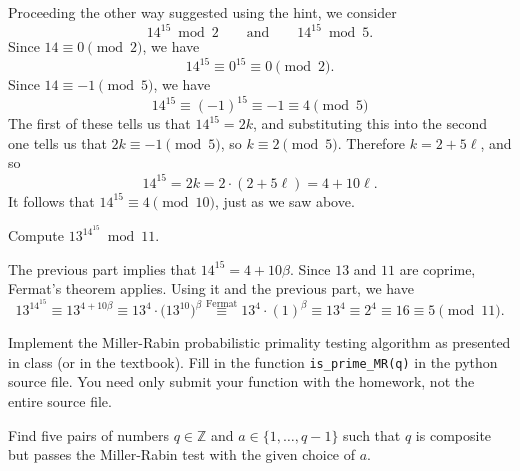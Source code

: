 \documentclass[oneside]{amsart}  %
\newcommand{\ZZ}{\mathbb{Z}}
\theoremstyle{plain}
\theoremstyle{definition}
\theoremstyle{remark}
\newcommand{\ds}[1]{ \displaystyle{#1} }
\numberwithin{equation}{section}  %
\begin{document}
\begin{questions}
\begin{questions}
\begin{solution}
Proceeding the other way suggested using the hint, we consider
\[
  14^{15} \bmod{2}
  \qquad\text{and}\qquad
  14^{15} \bmod{5}.
\]
Since $14 \equiv 0 \pmod{2}$, we have
\[
  14^{15}
  \equiv 0^{15}
  \equiv 0 \pmod{2}.
\]
Since $14 \equiv -1 \pmod{5}$, we have
\[
  14^{15}
  \equiv (-1)^{15}
  \equiv -1
  \equiv 4 \pmod{5}
\]
The first of these tells us that $14^{15} = 2k$, and substituting this
into the second one tells us that $2k \equiv -1 \pmod{5}$, so $k \equiv
2 \pmod{5}$. Therefore $k = 2+5\ell$, and so
\[
  14^{15}
  = 2k
  = 2\cdot (2 + 5\ell)
  = 4 + 10 \ell.
\]
It follows that $14^{15} \equiv 4 \pmod{10}$, just as we saw above.
\end{solution}   %
  \item Compute $\ds{13^{14^{15}} } \bmod{11}$.
\begin{solution}  %
The previous part implies that $14^{15} = 4 + 10\beta$. Since $13$ and
$11$ are coprime, Fermat's theorem applies. Using it and the previous
part, we have
\[
  13^{14^{15}}
  \equiv
  13^{4+10\beta}
  \equiv
  13^4 \cdot \big( 13^{10} \big)^{\beta}
  \stackrel{\text{Fermat}}{\equiv} 13^4 \cdot (1)^{\beta}
  \equiv 13^4
  \equiv 2^4
  \equiv 16
  \equiv 5 \pmod{11}.
\]
\end{solution}   %
\end{questions}
\item Implement the Miller-Rabin probabilistic primality testing algorithm as
presented in class (or in the textbook). Fill in the function
\verb|is_prime_MR(q)| in the python source file. You need only submit your
function with the homework, not the entire source file.
\item Find five pairs of numbers $q\in \ZZ$ and $a \in \{1, \dots, q-1\}$ such
that $q$ is composite but passes the Miller-Rabin test with the given choice of
$a$.
\end{questions} 
\end{document}

